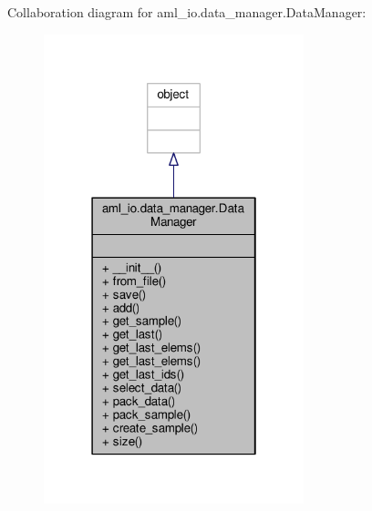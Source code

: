 Collaboration diagram for aml\-\_\-io.\-data\-\_\-manager.\-Data\-Manager\-:
\nopagebreak
\begin{figure}[H]
\begin{center}
\leavevmode
\includegraphics[width=214pt]{classaml__io_1_1data__manager_1_1_data_manager__coll__graph}
\end{center}
\end{figure}

